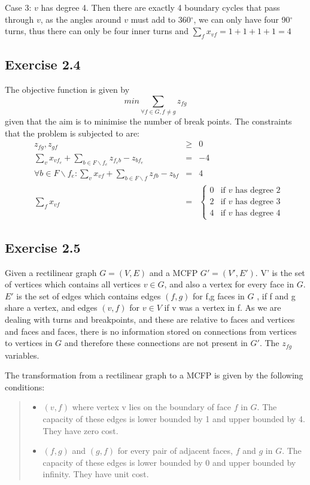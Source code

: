Case 3: \(v\) has degree 4.\newline
Then there are exactly 4 boundary cycles that pass through \(v\), as the angles around \(v\) must add to 360\(^\circ\),  we can only have four 90\(^\circ\) turns, thus there can only be four inner turns and  \(\sum_f x_{vf} = 1 +1 + 1+ 1= 4 \)

\subsection{Exercise 2.4}
The objective function is given by \[min \sum_{\forall f \in G, f \neq g} z_{fg}\] given that the aim is to minimise the number of break points. The constraints that the problem is subjected to are:
\begin{align}
  &z_{fg}, z_{gf}& \geq& 0\\
  &\sum_{v} x_{vf_{e}} + \sum_{b\in F \backslash {f_e}} z_{f_{e}b} - z_{bf_{e}}& =& -4\\
  &\forall b \in F \backslash {f_e}:\sum_{v} x_{vf} + \sum_{b\in F\backslash {f}} z_{fb} - z_{bf}& =& 4\\
  & \sum_f x_{vf} & =&
  \begin{cases}  
    0 & \text{if \(v\) has degree \(2\)}\\
    2 & \text{if \(v\) has degree \(3\)}\\
    4 & \text{if \(v\) has degree \(4\)}
  \end{cases}
\end{align}

\subsection{Exercise 2.5}
Given a rectilinear graph \(G = (V,E)\) and a MCFP \(G' = (V',E')\). V'  is the set of vertices which contains all vertices \(v \in G\), and also a vertex for every face in \(G\).  \(E'\) is the set of edges which contains edges \((f,g)\) for f,g faces in \(G\) , if f and g share a vertex, and edges \((v,f)\) for \(v \in V\) if v was a vertex in f. As we are dealing with turns and breakpoints, and these are relative to faces and vertices and faces and faces, there is no information stored on connections from vertices to vertices in \(G\) and therefore these connections are not present in \(G'\). The \(z_{fg}\) variables.

The transformation from a rectilinear graph to a MCFP is given by the following conditions:
\begin{quote}
  \begin{itemize}
    \item{} \((v,f)\) where vertex v lies on the boundary of face \(f\) in \(G\). The capacity of these
        edges is lower bounded by 1 and upper bounded by 4. They have zero cost.
    \item{} \((f,g)\) and \((g,f)\) for every pair of adjacent faces, \(f\) and \(g\) in \(G\). The capacity of these edges is lower bounded by 0 and upper bounded by infinity. They have unit cost.
  \end{itemize}
\end{quote}

